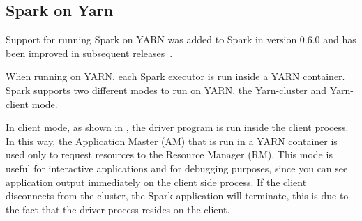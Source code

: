 

\subsection{Spark on Yarn}\label{subsec:sparkOnYarn}
Support for running Spark on YARN was added to Spark in version 0.6.0 and has been improved in subsequent releases~\cite{misc:SparkOnYarn}.

When running on YARN, each Spark executor is run inside a YARN container. Spark supports two different modes to run on YARN, the Yarn-cluster and Yarn-client mode.

In client mode, as shown in , the driver program is run inside the client process. In this way, the Application Master (AM) that is run in a YARN container is used only to request resources to the Resource Manager (RM). This mode is useful for interactive applications and for debugging purposes, since you can see application output
immediately on the client side process. If the client disconnects from the cluster, the Spark application will terminate, this is due to the fact that the driver process resides on the client.

